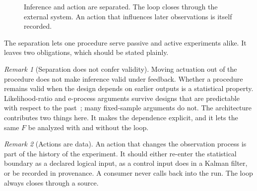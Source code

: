 \documentclass[11pt,a4paper]{article}
\theoremstyle{definition}
\theoremstyle{remark}
\newtheorem{remark}{Remark}
\begin{document}
\begin{figure}[t]
\centering
{}
\caption{
Inference and action are separated. The loop closes through the external
system. An action that influences later observations is itself recorded.
}
\label{fig:feedback}
\end{figure}

The separation lets one procedure serve passive and active experiments
alike. It leaves two obligations, which should be stated plainly.

\begin{remark}[Separation does not confer validity]
Moving actuation out of the procedure does not make inference valid
under feedback. Whether a procedure remains valid when the design
depends on earlier outputs is a statistical property. Likelihood-ratio
and e-process arguments survive designs that are predictable with
respect to the past~\cite{ramdas2023}; many fixed-sample arguments do
not. The architecture contributes two things here. It makes the
dependence explicit, and it lets the same $F$ be analyzed with and
without the loop.
\end{remark}

\begin{remark}[Actions are data]
An action that changes the observation process is part of the history
of the experiment. It should either re-enter the statistical boundary as
a declared logical input, as a control input does in a Kalman filter, or
be recorded in provenance. A consumer never calls back into the run. The
loop always closes through a source.
\end{remark}
\end{document}
